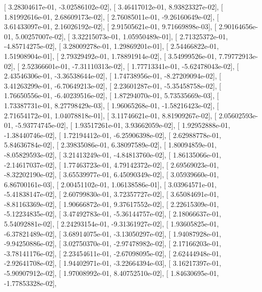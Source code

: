 \documentclass{article}
\begin{document}
       [  3.28304617e-01,  -3.02586102e-02],
       [  3.46417012e-01,   8.93823327e-02],
       [  1.81992616e-01,   2.68609173e-02],
       [  2.76085011e-01,  -9.26160649e-02],
       [  3.61433097e-01,   2.16026192e-02],
       [  2.91505621e-01,   9.71669898e-03],
       [  2.90164656e-01,   5.00257007e-02],
       [  3.32215073e-01,   1.05950489e-01],
       [  2.71325372e-01,  -4.85714275e-02],
       [  3.28009278e-01,   1.29869201e-01],
       [  2.54466822e-01,   1.51908904e-01],
       [  2.79329492e-01,   1.78891914e-02],
       [  3.54999526e-01,   7.79772913e-02],
       [  2.52366601e-01,  -7.31110313e-02],
       [  1.77713341e-01,  -5.62478043e-02],
       [  2.43546306e-01,  -3.36538644e-02],
       [  1.74738956e-01,  -8.27209094e-02],
       [  3.41263299e-01,  -6.70649213e-02],
       [  2.23601287e-01,  -5.35458758e-02],
       [  1.76650556e-01,  -6.40239516e-02],
       [  1.87294070e-01,   5.73535669e-03],
       [  1.73387731e-01,   8.27798429e-03],
       [  1.96065268e-01,  -1.58216423e-02],
       [  2.71654172e-01,   1.04078818e-01],
       [  3.11746621e-01,   8.81909267e-02],
       [  2.05602593e-01,  -5.93774745e-02],
       [  1.93517261e-01,   3.93662059e-02],
       [  1.92952888e-01,  -1.38440746e-02],
       [  1.72194412e-01,  -6.25906398e-02],
       [  2.62988778e-01,   5.84636784e-02],
       [  2.39835086e-01,   6.38097589e-02],
       [  1.80094859e-01,  -8.05829593e-02],
       [  3.21413249e-01,  -4.84813760e-02],
       [  1.86135066e-01,  -2.14617037e-02],
       [  1.77463723e-01,   4.79142372e-02],
       [  2.69569023e-01,  -8.32202190e-02],
       [  3.65539977e-01,   6.45090349e-02],
       [  3.05939660e-01,   6.86700161e-03],
       [  2.00451102e-01,   1.06138586e-01],
       [  3.03964571e-01,  -5.41838147e-02],
       [  2.60799830e-01,   3.72357727e-02],
       [  3.65084691e-01,  -8.81163369e-02],
       [  1.90666872e-01,   9.37617552e-02],
       [  2.22615309e-01,  -5.12234835e-02],
       [  3.47492783e-01,  -5.36144757e-02],
       [  2.18066637e-01,   5.54092881e-02],
       [  2.24293154e-01,  -9.31361927e-02],
       [  1.93605825e-01,  -6.37821489e-02],
       [  3.68914075e-01,  -3.13050297e-02],
       [  1.94087928e-01,  -9.94250886e-02],
       [  3.02750370e-01,  -2.97478982e-02],
       [  2.17166203e-01,  -3.78141176e-02],
       [  2.23454611e-01,  -2.67098095e-02],
       [  2.62444948e-01,  -2.92641708e-02],
       [  1.94402971e-01,  -3.22664394e-03],
       [  3.16217397e-01,  -5.90907912e-02],
       [  1.97008992e-01,   8.40752510e-02],
       [  1.84630695e-01,  -1.77853328e-02],
\end{document}
